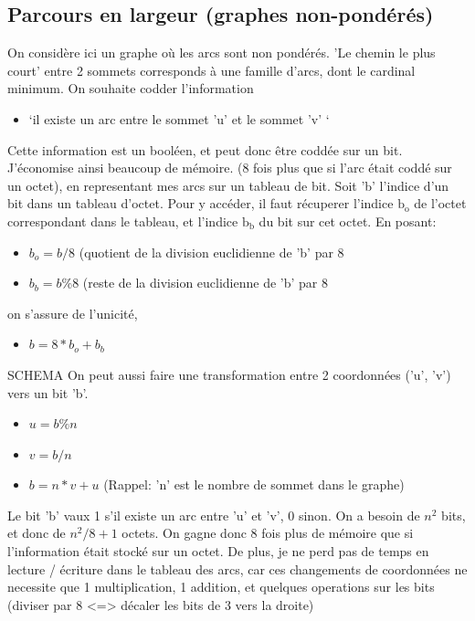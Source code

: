 \documentclass[10pt]{article}
\begin{document}
		\subsection{Parcours en largeur (graphes non-pondérés)}
			On considère ici un graphe où les arcs sont non pondérés.\newline
			'Le chemin le plus court' entre 2 sommets corresponds à une famille d'arcs, dont le cardinal minimum.\newline
			On souhaite codder l'information
			\begin{itemize}[label=-]
				\item `il existe un arc entre le sommet 'u' et le sommet 'v' `
			\end{itemize}
			Cette information est un booléen, et peut donc être coddée sur un bit.
			J'économise ainsi beaucoup de mémoire. (8 fois plus que si l'arc était coddé sur un octet),
			en representant mes arcs sur un tableau de bit.\newline\newline
			Soit 'b' l'indice d'un bit dans un tableau d'octet.
			Pour y accéder, il faut récuperer l'indice $\textrm{b}_\textrm{o}$ de l'octet correspondant dans le tableau,
			et l'indice $\textrm{b}_\textrm{b}$ du bit sur cet octet.\newline
			En posant:
			\begin{itemize}[label=-]
				\item \(b_o = b / 8\) (quotient de la division euclidienne de 'b' par 8
				\item \(b_b = b \% 8\) (reste de la division euclidienne de 'b' par 8
			\end{itemize}
			on s'assure de l'unicité,
			\begin{itemize}[label=-]
				\item \(b = 8*b_o+b_b\)
			\end{itemize}
			{SCHEMA}
			On peut aussi faire une transformation entre 2 coordonnées ('u', 'v') vers un bit 'b'.
			\begin{itemize}[label=-]
				\item \(u = b \% n\)
				\item \(v = b / n\)
				\item \(b = n * v + u\) (Rappel: 'n' est le nombre de sommet dans le graphe)
			\end{itemize}
			Le bit 'b' vaux 1 s'il existe un arc entre 'u' et 'v', 0 sinon.
			On a besoin de \(n^2\) bits, et donc de \(n^2 / 8 + 1\) octets.
			On gagne donc 8 fois plus de mémoire que si l'information était stocké sur un octet.
			De plus, je ne perd pas de temps en lecture / écriture dans le tableau des arcs, car ces changements
			de coordonnées ne necessite que 1 multiplication, 1 addition, et quelques operations sur les bits (diviser par 8 <=> décaler
			les bits de 3 vers la droite)\newline
			
\end{document}
